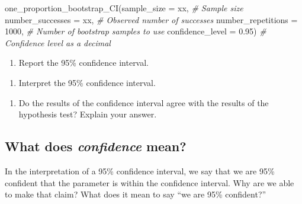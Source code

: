 \documentclass[
]{report}
\newenvironment{Shaded}{\begin{snugshade}}{\end{snugshade}}
\newcommand{\AttributeTok}[1]{\textcolor[rgb]{0.77,0.63,0.00}{#1}}
\newcommand{\CommentTok}[1]{\textcolor[rgb]{0.56,0.35,0.01}{\textit{#1}}}
\newcommand{\DecValTok}[1]{\textcolor[rgb]{0.00,0.00,0.81}{#1}}
\newcommand{\FloatTok}[1]{\textcolor[rgb]{0.00,0.00,0.81}{#1}}
\newcommand{\FunctionTok}[1]{\textcolor[rgb]{0.00,0.00,0.00}{#1}}
\newcommand{\NormalTok}[1]{#1}
\providecommand{\tightlist}{%
  \setlength{\itemsep}{0pt}\setlength{\parskip}{0pt}}
\begin{document}
\begin{Shaded}
\begin{Highlighting}[]
\FunctionTok{one\_proportion\_bootstrap\_CI}\NormalTok{(}\AttributeTok{sample\_size =}\NormalTok{ xx, }\CommentTok{\# Sample size}
                    \AttributeTok{number\_successes =}\NormalTok{ xx, }\CommentTok{\# Observed number of successes}
                    \AttributeTok{number\_repetitions =} \DecValTok{1000}\NormalTok{, }\CommentTok{\# Number of bootstrap samples to use}
                    \AttributeTok{confidence\_level =} \FloatTok{0.95}\NormalTok{) }\CommentTok{\# Confidence level as a decimal}
\end{Highlighting}
\end{Shaded}

\begin{enumerate}
\def\labelenumi{\arabic{enumi}.}
\setcounter{enumi}{10}
\tightlist
\item
  Report the 95\% confidence interval.
\end{enumerate}

\vspace{0.5in}

\begin{enumerate}
\def\labelenumi{\arabic{enumi}.}
\setcounter{enumi}{11}
\tightlist
\item
  Interpret the 95\% confidence interval.
\end{enumerate}

\vspace{0.8in}

\begin{enumerate}
\def\labelenumi{\arabic{enumi}.}
\setcounter{enumi}{12}
\tightlist
\item
  Do the results of the confidence interval agree with the results of the hypothesis test? Explain your answer.
\end{enumerate}

\vspace{0.8in}

\hypertarget{what-does-confidence-mean}{%
\subsection{\texorpdfstring{What does \emph{confidence} mean?}{What does confidence mean?}}\label{what-does-confidence-mean}}

In the interpretation of a 95\% confidence interval, we say that we are 95\% confident that the parameter is within the confidence interval. Why are we able to make that claim? What does it mean to say ``we are 95\% confident?''
\end{document}
